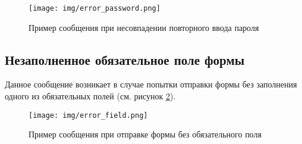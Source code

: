 \documentclass[a4paper,12pt,reqno]{article}
\begin{document}
    \begin{figure}[H]
        \centering
        \texttt{[image: img/error\_password.png]}
        \caption{Пример сообщения при несовпадении повторного ввода пароля}
        \label{pic:error_password}
    \end{figure}

    \subsection{Незаполненное обязательное поле формы}
    Данное сообщение возникает в случае попытки отправки формы без заполнения одного из обязательных полей (см. рисунок \ref{pic:error_field}).

    \begin{figure}[H]
        \centering
        \texttt{[image: img/error\_field.png]}
        \caption{Пример сообщения при отправке формы без обязательного поля}
        \label{pic:error_field}
    \end{figure}

    \newpage
    \printbibliography[title=Список источников, heading=bibintoc]

    \newpage
    

    \newpage
    \listRegistration
\end{document}
